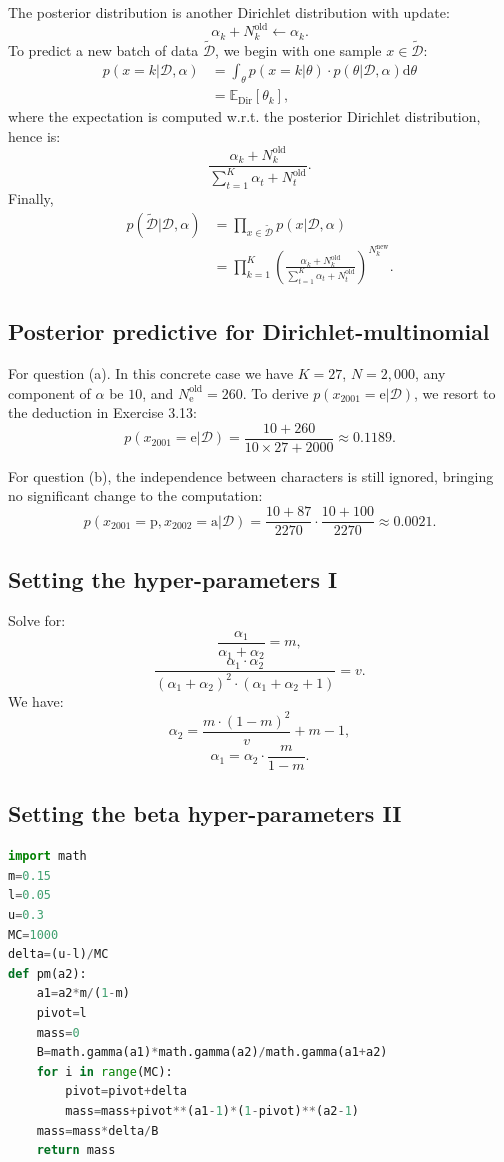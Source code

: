 \documentclass[UTF8]{ctexart}
\begin{document}
The posterior distribution is another Dirichlet distribution with update:
$$\alpha_{k}+N_{k}^{\text{old}}\leftarrow \alpha_{k}.$$
To predict a new batch of data $\tilde{\mathcal{D}}$, we begin with one sample $x\in\tilde{\mathcal{D}}$:
$$
\begin{aligned}
p(x=k|\mathcal{D},\alpha)&=\int_{\theta}p(x=k|\theta)\cdot p(\theta|\mathcal{D},\alpha)\text{d}\theta\\
&=\mathbb{E}_{\text{Dir}}[\theta_{k}],
\end{aligned}
$$
where the expectation is computed w.r.t. the posterior Dirichlet distribution, hence is:
$$\frac{\alpha_{k}+N_{k}^{\text{old}}}{\sum_{t=1}^{K}\alpha_{t}+N_{t}^{\text{old}}}.$$
Finally,
$$
\begin{aligned}
p(\tilde{\mathcal{D}}|\mathcal{D},\alpha)&=\prod_{x\in\tilde{\mathcal{D}}}p(x|\mathcal{D},\alpha)\\
&=\prod_{k=1}^{K}\left( \frac{\alpha_{k}+N_{k}^{\text{old}}}{\sum_{t=1}^{K}\alpha_{t}+N_{t}^{\text{old}}} \right)^{N_{k}^{\text{new}}}.
\end{aligned}
$$

\subsection{Posterior predictive for Dirichlet-multinomial}
For question (a).
In this concrete case we have $K=27$, $N=2,000$, any component of $\alpha$ be $10$, and $N_{\text{e}}^{\text{old}}=260$.
To derive $p(x_{2001}=\text{e}|\mathcal{D})$, we resort to the deduction in Exercise 3.13:
$$p(x_{2001}=\text{e}|\mathcal{D})=\frac{10+260}{10\times 27+2000}\approx 0.1189.$$

For question (b), the independence between characters is still ignored, bringing no significant change to the computation:
$$p(x_{2001}=\text{p},x_{2002}=\text{a}|\mathcal{D})=\frac{10+87}{2270}\cdot \frac{10+100}{2270}\approx 0.0021.$$

\subsection{Setting the hyper-parameters I}
Solve for:
$$\frac{\alpha_{1}}{\alpha_{1}+\alpha_{2}}=m,$$
$$\frac{\alpha_{1}\cdot\alpha_{2}}{(\alpha_{1}+\alpha_{2})^{2}\cdot(\alpha_{1}+\alpha_{2}+1)}=v.$$
We have:
$$\alpha_{2}=\frac{m\cdot(1-m)^{2}}{v}+m-1,$$
$$\alpha_{1}=\alpha_{2}\cdot\frac{m}{1-m}.$$


\subsection{Setting the beta hyper-parameters II}
\begin{lstlisting}[language=Python]
import math
m=0.15
l=0.05
u=0.3
MC=1000
delta=(u-l)/MC
def pm(a2):
    a1=a2*m/(1-m)
    pivot=l
    mass=0
    B=math.gamma(a1)*math.gamma(a2)/math.gamma(a1+a2)
    for i in range(MC):
        pivot=pivot+delta
        mass=mass+pivot**(a1-1)*(1-pivot)**(a2-1)
    mass=mass*delta/B
    return mass
\end{lstlisting}
\end{document}
